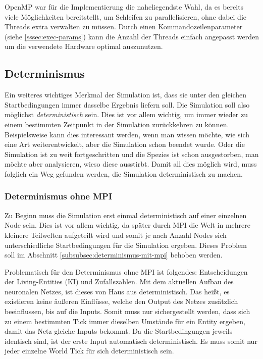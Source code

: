 \documentclass[course=erap]{aspdoc}
\begin{document}
OpenMP war für die Implementierung die naheliegendste Wahl, da es bereits viele Möglichkeiten bereitstellt, um Schleifen zu parallelisieren, ohne dabei die Threads extra verwalten zu müssen. Durch einen Kommandozeilenparameter (siehe \ref{sssec:exec-params}) kann die Anzahl der Threads einfach angepasst werden um die verwendete Hardware optimal auszunutzen.


\subsection{Determinismus}
\label{subsec:determinismus}
Ein weiteres wichtiges Merkmal der Simulation ist, dass sie unter den gleichen Startbedingungen immer dasselbe Ergebnis liefern soll. Die Simulation soll also möglichst \emph{deterministisch} sein. Dies ist vor allem wichtig, um immer wieder zu einem bestimmten Zeitpunkt in der Simulation zurückkehren zu können. Beispielsweise kann dies interessant werden, wenn man wissen möchte, wie sich eine Art weiterentwickelt, aber die Simulation schon beendet wurde. Oder die Simulation ist zu weit fortgeschritten und die Spezies ist schon ausgestorben, man möchte aber analysieren, wieso diese ausstirbt. Damit all dies möglich wird, muss folglich ein Weg gefunden werden, die Simulation deterministisch zu machen.


\subsubsection{Determinismus ohne MPI}
\label{subsubsec:determinismus-ohne-mpi}
Zu Beginn muss die Simulation erst einmal deterministisch auf einer einzelnen Node sein. Dies ist vor allem wichtig, da später durch MPI die Welt in mehrere kleinere Teilwelten aufgeteilt wird und somit je nach Anzahl Nodes sich unterschiedliche Startbedingungen für die Simulation ergeben. Dieses Problem soll im Abschnitt \ref{subsubsec:determinismus-mit-mpi} behoben werden.

Problematisch für den Determinismus ohne MPI ist folgendes: Entscheidungen der Living-Entities (KI) und Zufallszahlen. Mit dem aktuellen Aufbau des neuronalen Netzes, ist dieses von Haus aus deterministisch. Das heißt, es existieren keine äußeren Einflüsse, welche den Output des Netzes zusätzlich beeinflussen, bis auf die Inputs. Somit muss nur sichergestellt werden, dass sich zu einem bestimmten Tick immer dieselben Umstände für ein Entity ergeben, damit das Netz gleiche Inputs bekommt. Da die Startbedingungen jeweils identisch sind, ist der erste Input automatisch deterministisch. Es muss somit nur jeder einzelne World Tick für sich deterministisch sein.
\end{document}
